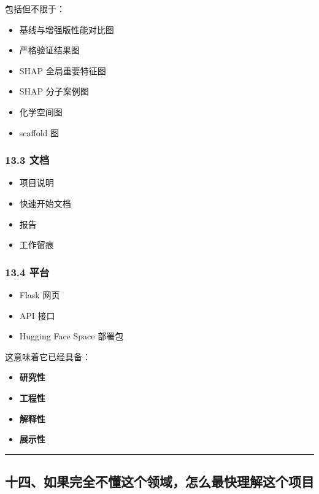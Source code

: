 \documentclass[
  ,
]{ctexart}
\providecommand{\tightlist}{%
  \setlength{\itemsep}{0pt}\setlength{\parskip}{0pt}}
\begin{document}
包括但不限于：

\begin{itemize}
\tightlist
\item
  基线与增强版性能对比图
\item
  严格验证结果图
\item
  SHAP 全局重要特征图
\item
  SHAP 分子案例图
\item
  化学空间图
\item
  scaffold 图
\end{itemize}

\hypertarget{ux6587ux6863}{%
\subsubsection{13.3 文档}\label{ux6587ux6863}}

\begin{itemize}
\tightlist
\item
  项目说明
\item
  快速开始文档
\item
  报告
\item
  工作留痕
\end{itemize}

\hypertarget{ux5e73ux53f0}{%
\subsubsection{13.4 平台}\label{ux5e73ux53f0}}

\begin{itemize}
\tightlist
\item
  Flask 网页
\item
  API 接口
\item
  Hugging Face Space 部署包
\end{itemize}

这意味着它已经具备：

\begin{itemize}
\tightlist
\item
  \textbf{研究性}
\item
  \textbf{工程性}
\item
  \textbf{解释性}
\item
  \textbf{展示性}
\end{itemize}

\begin{center}\rule{0.5\linewidth}{0.5pt}\end{center}

\hypertarget{ux5341ux56dbux5982ux679cux5b8cux5168ux4e0dux61c2ux8fd9ux4e2aux9886ux57dfux600eux4e48ux6700ux5febux7406ux89e3ux8fd9ux4e2aux9879ux76ee}{%
\subsection{十四、如果完全不懂这个领域，怎么最快理解这个项目}\label{ux5341ux56dbux5982ux679cux5b8cux5168ux4e0dux61c2ux8fd9ux4e2aux9886ux57dfux600eux4e48ux6700ux5febux7406ux89e3ux8fd9ux4e2aux9879ux76ee}}
\end{document}
